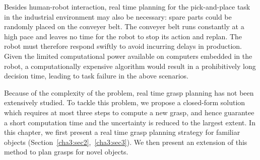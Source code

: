 Besides human-robot interaction, real time planning for the pick-and-place task in the industrial environment may also be necessary: spare parts could be randomly placed on the conveyer belt.
The conveyer belt runs constantly at a high pace and leaves no time for the robot to stop its action and replan.
The robot must therefore respond swiftly to avoid incurring delays in production. Given the limited computational power available on computers embedded in the robot, a computationally expensive algorithm would result in a prohibitively long decision time, leading to task failure in the above scenarios.

Because of the complexity of the problem, real time grasp planning has not been extensively studied. To tackle this problem, we propose a closed-form solution which requires at most three steps to compute a new grasp, and hence guarantee a short computation time and the uncertainty is reduced to the largest extent. In this chapter, we first present a real time grasp planning strategy for familiar objects (Section~\ref{cha3:sec2},~\ref{cha3:sec3}). We then present an extension of this method to plan grasps for novel objects.




